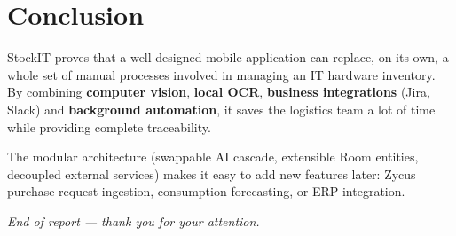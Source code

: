 \documentclass[11pt,a4paper]{article}
\begin{document}
\section{Conclusion}

StockIT proves that a well-designed mobile application can replace,
on its own, a whole set of manual processes involved in managing an
IT hardware inventory. By combining \textbf{computer vision},
\textbf{local OCR}, \textbf{business integrations} (Jira, Slack) and
\textbf{background automation}, it saves the logistics team a lot of
time while providing complete traceability.

The modular architecture (swappable AI cascade, extensible Room
entities, decoupled external services) makes it easy to add new
features later: Zycus purchase-request ingestion, consumption
forecasting, or ERP integration.

\vspace{6pt}
\begin{center}
\color{primary!70}\itshape\small
End of report — thank you for your attention.
\end{center}
\end{document}
